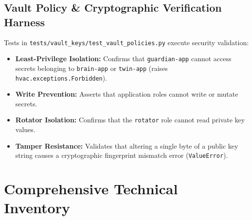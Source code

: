 \documentclass[10pt,a4paper]{report}
\begin{document}
\section{Vault Policy \& Cryptographic Verification Harness}
Tests in \texttt{tests/vault\_keys/test\_vault\_policies.py} execute security validation:
\begin{itemize}[leftmargin=*]
  \item \textbf{Least-Privilege Isolation:} Confirms that \texttt{guardian-app} cannot access secrets belonging to \texttt{brain-app} or \texttt{twin-app} (raises \lstinline{hvac.exceptions.Forbidden}).
  \item \textbf{Write Prevention:} Asserts that application roles cannot write or mutate secrets.
  \item \textbf{Rotator Isolation:} Confirms that the \texttt{rotator} role cannot read private key values.
  \item \textbf{Tamper Resistance:} Validates that altering a single byte of a public key string causes a cryptographic fingerprint mismatch error (\lstinline{ValueError}).
\end{itemize}

\chapter{Comprehensive Technical Inventory}
\end{document}
